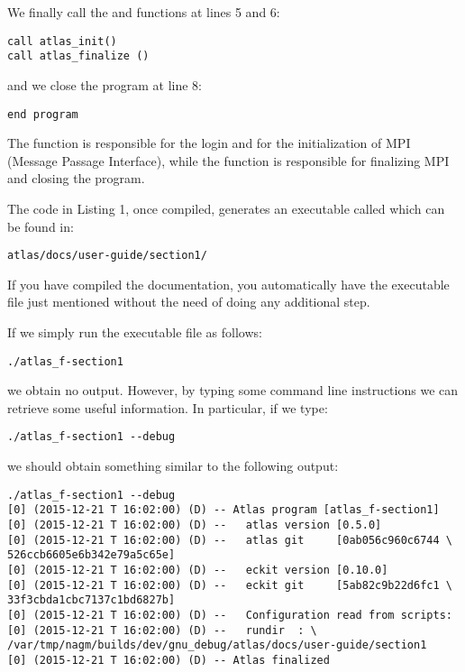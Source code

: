 We finally call the \Atlas {} and  
functions at lines 5 and 6:
%
\begin{lstlisting}[style=FStyleNoLine]
call atlas_init()
call atlas_finalize ()
\end{lstlisting}
%
and we close the program at line 8:
%
\begin{lstlisting}[style=FStyleNoLine]
end program
\end{lstlisting}
%

The function  is responsible for the login 
and for the initialization of MPI (Message Passage Interface), 
while the function  is responsible for
finalizing MPI and closing the program.

The code in Listing 1, once compiled, generates an executable 
called  which can be found in:
%
\begin{lstlisting}[style=BashStyle]
atlas/docs/user-guide/section1/
\end{lstlisting}

% 
\begin{notebox}
If you have compiled the documentation, you automatically have 
the executable file just mentioned without the need of doing 
any additional step.
\end{notebox}
%

If we simply run the executable file as follows:
%
\begin{lstlisting}[style=BashStyle]
./atlas_f-section1
\end{lstlisting}
% 
we obtain no output. 
However, by typing some command line instructions we can 
retrieve some useful information. In particular, if we 
type:
%
\begin{lstlisting}[style=BashStyle]
./atlas_f-section1 --debug
\end{lstlisting}
%
we should obtain something similar to the following output:
%
\begin{lstlisting}[style=BashStyle]
./atlas_f-section1 --debug
[0] (2015-12-21 T 16:02:00) (D) -- Atlas program [atlas_f-section1]
[0] (2015-12-21 T 16:02:00) (D) --   atlas version [0.5.0]
[0] (2015-12-21 T 16:02:00) (D) --   atlas git     [0ab056c960c6744 \
526ccb6605e6b342e79a5c65e]
[0] (2015-12-21 T 16:02:00) (D) --   eckit version [0.10.0]
[0] (2015-12-21 T 16:02:00) (D) --   eckit git     [5ab82c9b22d6fc1 \
33f3cbda1cbc7137c1bd6827b]
[0] (2015-12-21 T 16:02:00) (D) --   Configuration read from scripts:
[0] (2015-12-21 T 16:02:00) (D) --   rundir  : \ 
/var/tmp/nagm/builds/dev/gnu_debug/atlas/docs/user-guide/section1
[0] (2015-12-21 T 16:02:00) (D) -- Atlas finalized
\end{lstlisting}
%

